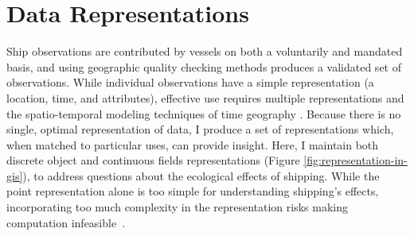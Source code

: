 \section{Data Representations}


Ship observations are contributed by vessels on both a voluntarily and mandated basis, and using geographic quality checking methods produces a validated set of observations. While individual observations have a simple representation (a location, time, and attributes), effective use requires multiple representations \citep{Goodchild1992} and the spatio-temporal modeling techniques of time geography \citep{miller2008field}.  Because there is no single, optimal representation of data, I produce a set of representations which, when matched to particular uses, can provide insight.  Here, I maintain both discrete object and continuous fields representations (Figure \ref{fig:representation-in-gis}), to address questions about the ecological effects of shipping. While the point representation alone is too simple for understanding shipping's effects, incorporating too much complexity in the representation risks making computation infeasible~\citep{de2007geospatial}.



